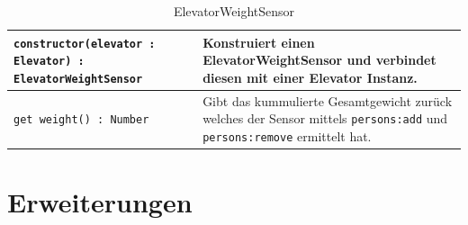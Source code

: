 \begin{table}[htb]
	\begin{tabularx}{0.92\textwidth}{lX}
		\texttt{constructor(elevator : Elevator) : ElevatorWeightSensor} & Konstruiert einen ElevatorWeightSensor und verbindet diesen mit einer Elevator Instanz. \\ \hline
		\texttt{get weight() : Number} & Gibt das kummulierte Gesamtgewicht zurück welches der Sensor mittels \texttt{persons:add} und \texttt{persons:remove} ermittelt hat. \\ \hline
	\end{tabularx}
\caption{ElevatorWeightSensor}
\end{table}

\section{Erweiterungen}
